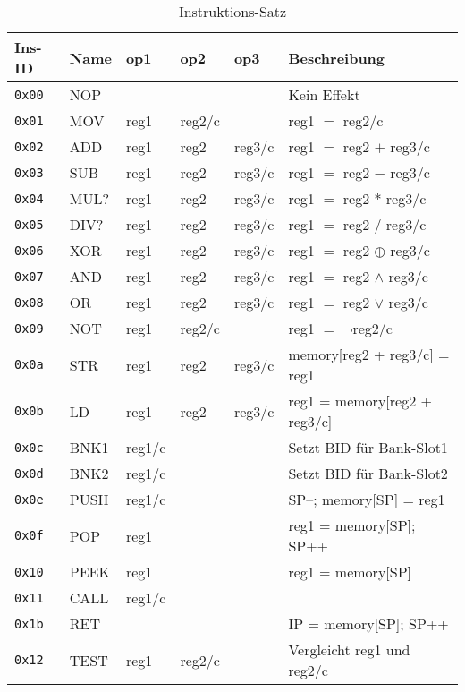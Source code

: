 \documentclass{scrartcl}
\begin{document}
\begin{center}
	\begin{table*}
		\caption{\label{table:instructions}Instruktions-Satz}
		\begin{tabular}{l | l l l l | l}
			Ins-ID & Name & op1 & op2 & op3 & Beschreibung \\
			\hline
			\texttt{0x00} & NOP  &  &  &  & Kein Effekt  \\
			\hline
			\texttt{0x01} & MOV  & reg1 & reg2/c &  & reg1 $=$ reg2/c\\
			\texttt{0x02} & ADD  & reg1 & reg2 & reg3/c & reg1 $=$ reg2 $+$ reg3/c \\
			\texttt{0x03} & SUB  & reg1 & reg2 & reg3/c & reg1 $=$ reg2 $-$ reg3/c \\
			\texttt{0x04} & MUL? & reg1 & reg2 & reg3/c & reg1 $=$ reg2 $*$ reg3/c \\
			\texttt{0x05} & DIV? & reg1 & reg2 & reg3/c & reg1 $=$ reg2 $/$ reg3/c \\
			\texttt{0x06} & XOR  & reg1 & reg2 & reg3/c & reg1 $=$ reg2 $\oplus$ reg3/c \\
			\texttt{0x07} & AND  & reg1 & reg2 & reg3/c & reg1 $=$ reg2 $\land$ reg3/c \\
			\texttt{0x08} & OR   & reg1 & reg2 & reg3/c & reg1 $=$ reg2 $\lor$ reg3/c \\
			\texttt{0x09} & NOT  & reg1 & reg2/c &      & reg1 $=$ $\lnot$reg2/c \\
			\hline 
			\texttt{0x0a} & STR  & reg1 & reg2 & reg3/c & memory[reg2 + reg3/c] = reg1  \\
			\texttt{0x0b} & LD   & reg1 & reg2 & reg3/c & reg1 = memory[reg2 + reg3/c] \\
			\texttt{0x0c} & BNK1 & reg1/c &  &  & Setzt BID für Bank-Slot1 \\
			\texttt{0x0d} & BNK2 & reg1/c &  &  & Setzt BID für Bank-Slot2 \\
			\hline
			\texttt{0x0e} & PUSH & reg1/c &  &  & SP--; memory[SP] = reg1 \\
			\texttt{0x0f} & POP  & reg1 &  &  & reg1 = memory[SP]; SP++ \\
			\texttt{0x10} & PEEK & reg1 &  &  & reg1 = memory[SP] \\
			\texttt{0x11} & CALL & reg1/c &  &  & \vtop{
				\hbox{\strut memory[SP] = IP; SP++;}
				\hbox{\strut IP = reg1/c}} \\
			\texttt{0x1b} & RET  &  &  &  & IP = memory[SP]; SP++ \\
			\hline
			\texttt{0x12} & TEST & reg1 & reg2/c &  & Vergleicht reg1 und reg2/c \\

\end{tabular}
\end{table*}
\end{center}
\end{document}
